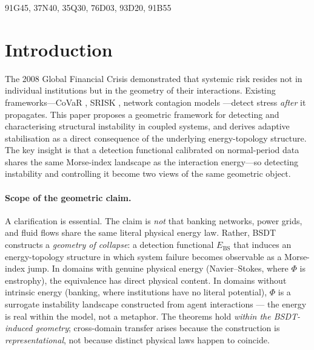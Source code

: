 \documentclass[final]{siamltex}
\newcommand{\Ebs}{E_{\mathrm{BS}}}
\begin{document}
\begin{AMS}
91G45, 37N40, 35Q30, 76D03, 93D20, 91B55
\end{AMS}

\section{Introduction}\label{sec:intro}

The 2008 Global Financial Crisis demonstrated that systemic risk
resides not in individual institutions but in the geometry of
their interactions. Existing frameworks---CoVaR
\cite{adrian2016covar}, SRISK \cite{brownlees2017srisk},
network contagion models \cite{acemoglu2015systemic,
elliott2014financial}---detect stress \emph{after} it
propagates. This paper proposes a geometric framework for
detecting and characterising structural instability in coupled
systems, and derives adaptive stabilisation as a direct consequence
of the underlying energy-topology structure.  The key insight is
that a detection functional calibrated on normal-period data
shares the same Morse-index landscape as the interaction
energy---so detecting instability and controlling it become two
views of the same geometric object.

\paragraph{Scope of the geometric claim.}
A clarification is essential.  The claim is \emph{not} that banking
networks, power grids, and fluid flows share the same literal
physical energy law.  Rather, BSDT constructs a
\emph{geometry of collapse}: a detection functional $\Ebs$ that
induces an energy-topology structure in which system failure becomes
observable as a Morse-index jump.  In domains with genuine physical
energy (Navier--Stokes, where $\Phi$ is enstrophy), the
equivalence has direct physical content.  In domains without
intrinsic energy (banking, where institutions have no literal
potential), $\Phi$ is a surrogate instability landscape
constructed from agent interactions --- the energy is real within
the model, not a metaphor.  The theorems hold \emph{within the
BSDT-induced geometry}; cross-domain transfer arises because the
construction is \emph{representational}, not because distinct
physical laws happen to coincide.
\end{document}
